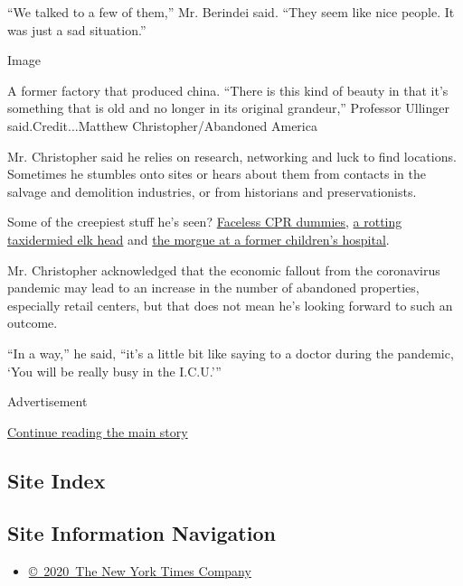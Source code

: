 ``We talked to a few of them,'' Mr. Berindei said. ``They seem like nice
people. It was just a sad situation.''

Image

A former factory that produced china. ``There is this kind of beauty in
that it's something that is old and no longer in its original
grandeur,'' Professor Ullinger said.Credit...Matthew
Christopher/Abandoned America

Mr. Christopher said he relies on research, networking and luck to find
locations. Sometimes he stumbles onto sites or hears about them from
contacts in the salvage and demolition industries, or from historians
and preservationists.

Some of the creepiest stuff he's seen?
\href{https://twitter.com/abandonedameric/status/1057725225205465089?s=20}{Faceless
CPR dummies},
\href{https://twitter.com/abandonedameric/status/1057737618702692352}{a
rotting taxidermied elk head} and
\href{https://twitter.com/abandonedameric/status/1157330150515761153}{the
morgue at a former children's hospital}.

Mr. Christopher acknowledged that the economic fallout from the
coronavirus pandemic may lead to an increase in the number of abandoned
properties, especially retail centers, but that does not mean he's
looking forward to such an outcome.

``In a way,'' he said, ``it's a little bit like saying to a doctor
during the pandemic, `You will be really busy in the I.C.U.'''

Advertisement

\protect\hyperlink{after-bottom}{Continue reading the main story}

\hypertarget{site-index}{%
\subsection{Site Index}\label{site-index}}

\hypertarget{site-information-navigation}{%
\subsection{Site Information
Navigation}\label{site-information-navigation}}

\begin{itemize}
\tightlist
\item
  \href{https://help.nytimes3xbfgragh.onion/hc/en-us/articles/115014792127-Copyright-notice}{©~2020~The
  New York Times Company}
\end{itemize}

